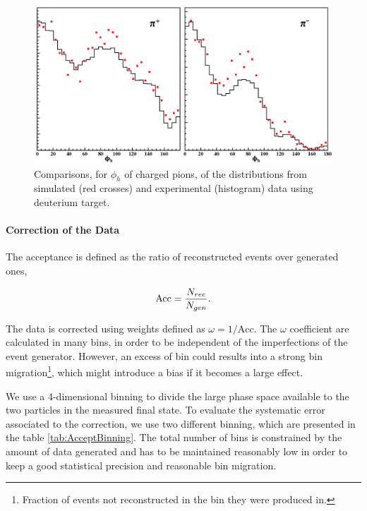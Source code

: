 \begin{figure}[tbp]
\centering
\includegraphics[width=12cm] {chap5-fig/phih_compar.png}
\caption {Comparisons, for $\phi_h$ of charged pions, of the distributions
from simulated (red crosses) and experimental (histogram) data using deuterium target.}
\label{fig:compPhih}
\end{figure}


\paragraph{Correction of the Data}

The acceptance is defined as the ratio of reconstructed events over generated ones,

\begin{equation}
\label{eq:acc}
\text{Acc} = {N_{rec} \over N_{gen}}.
\end{equation}

The data is corrected using weights defined as $\omega = 1/\text{Acc}$. The 
$\omega$ coefficient are calculated in many bins, in order to be independent of 
the imperfections of the event generator. However, an excess of bin could results into a strong 
bin migration\footnote{Fraction of events not reconstructed in the bin they 
were produced in.}, which might introduce a bias if it becomes a large effect.

We use a 4-dimensional binning to divide the large phase space available to 
the two particles in the measured final state. To evaluate the systematic error 
associated to the correction, we use two different binning, which are 
presented in the table \ref{tab:AcceptBinning}. The total number of bins is 
constrained by the amount of data generated and has to be maintained 
reasonably low in order to keep a good statistical precision and reasonable 
bin migration.

